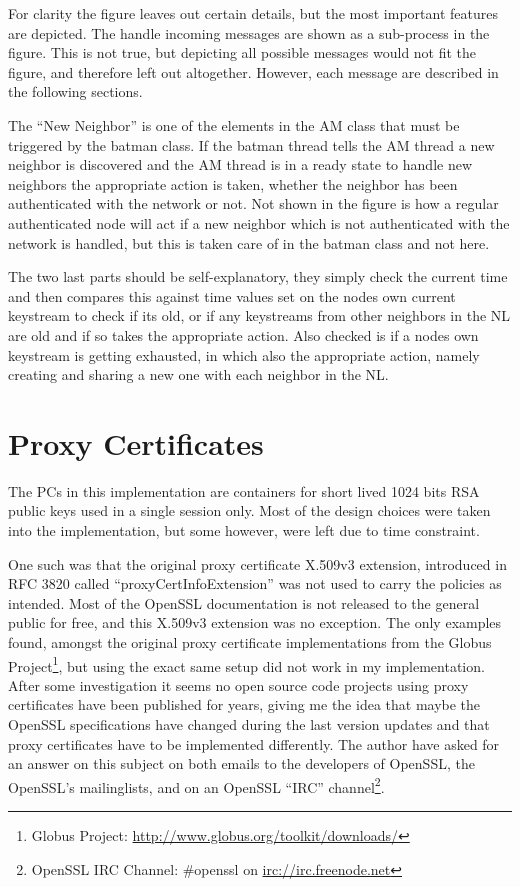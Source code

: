 For clarity the figure leaves out certain details, but the most important
features are depicted. The handle incoming messages are shown as a sub-process
in the figure.  This is not true, but depicting all possible messages would not
fit the figure, and therefore left out altogether. However, each message are
described in the following sections.

The ``New Neighbor'' is one of the elements in the AM class that must be
triggered by the batman class. If the batman thread tells the AM thread a new
neighbor is discovered and the AM thread is in a ready state to handle new
neighbors the appropriate action is taken, whether the neighbor has been
authenticated with the network or not. Not shown in the figure is how a regular
authenticated node will act if a new neighbor which is not authenticated with
the network is handled, but this is taken care of in the batman class and not
here.

The two last parts should be self-explanatory, they simply check the current
time and then compares this against time values set on the nodes own current
keystream to check if its old, or if any keystreams from other neighbors in the
\ac{NL} are old and if so takes the appropriate action. Also checked is if a
nodes own keystream is getting exhausted, in which also the appropriate action,
namely creating and sharing a new one with each neighbor in the \ac{NL}.


\section{Proxy Certificates}
The \acp{PC} in this implementation are containers for short lived 1024 bits RSA
public keys used in a single session only. Most of the design choices were taken
into the implementation, but some however, were left due to time constraint.

One such was that the original proxy certificate X.509v3 extension, introduced
in RFC 3820 called ``proxyCertInfoExtension'' was not used to carry the policies as
intended. Most of the OpenSSL documentation is not released to the general
public for free, and this X.509v3 extension was no exception. The only examples
found, amongst the original proxy certificate implementations from the Globus
Project\footnote{Globus Project:
\url{http://www.globus.org/toolkit/downloads/}}, but using the exact same setup
did not work in my implementation. After some investigation it seems no open
source code projects using proxy certificates have been published for years,
giving me the idea that maybe the OpenSSL specifications have changed during
the last version updates and that proxy certificates have to be implemented
differently. The author have asked for an answer on this subject on both emails
to the developers of OpenSSL, the OpenSSL's mailinglists, and on an
OpenSSL ``IRC'' channel\footnote{OpenSSL IRC Channel: \#openssl on
\url{irc://irc.freenode.net}}.

